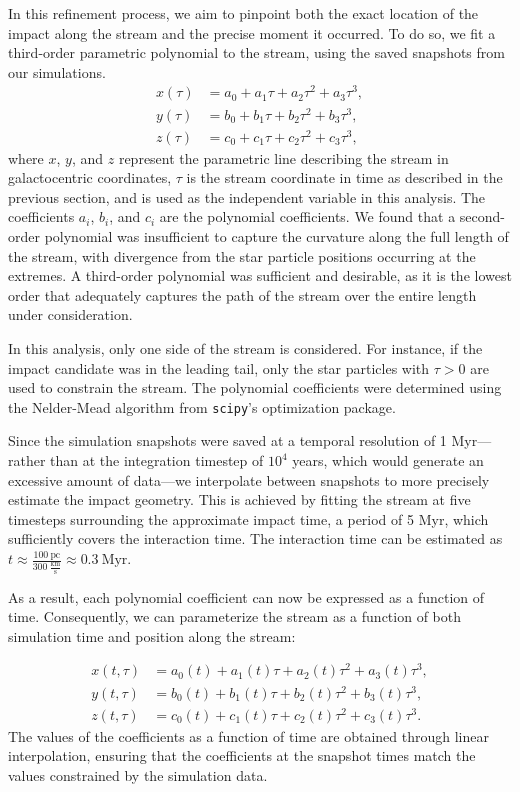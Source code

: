 \documentclass[]{aa}
\begin{document}
    In this refinement process, we aim to pinpoint both the exact location of the impact along the stream and the precise moment it occurred. To do so, we fit a third-order parametric polynomial to the stream, using the saved snapshots from our simulations.
    \begin{align}
      x(\tau) &= a_0 + a_1 \tau + a_2 \tau^2 + a_3 \tau^3, \\ 
      y(\tau) &= b_0 + b_1 \tau + b_2 \tau^2 + b_3 \tau^3, \\
      z(\tau) &= c_0 + c_1 \tau + c_2 \tau^2 + c_3 \tau^3,
      \end{align}
    where $x$, $y$, and $z$ represent the parametric line describing the stream in galactocentric coordinates, $\tau$ is the stream coordinate in time as described in the previous section, and is used as the independent variable in this analysis. The coefficients $a_i$, $b_i$, and $c_i$ are the polynomial coefficients. We found that a second-order polynomial was insufficient to capture the curvature along the full length of the stream, with divergence from the star particle positions occurring at the extremes. A third-order polynomial was sufficient and desirable, as it is the lowest order that adequately captures the path of the stream over the entire length under consideration.

    In this analysis, only one side of the stream is considered. For instance, if the impact candidate was in the leading tail, only the star particles with $\tau > 0$ are used to constrain the stream. The polynomial coefficients were determined using the Nelder-Mead algorithm from \texttt{scipy}'s optimization package.

    Since the simulation snapshots were saved at a temporal resolution of 1 Myr—rather than at the integration timestep of $10^4$ years, which would generate an excessive amount of data—we interpolate between snapshots to more precisely estimate the impact geometry. This is achieved by fitting the stream at five timesteps surrounding the approximate impact time, a period of 5 Myr, which sufficiently covers the interaction time. The interaction time can be estimated as $t \approx \frac{100~\text{pc}}{300~\frac{\text{km}}{\text{s}}} \approx 0.3~\text{Myr}$.

    As a result, each polynomial coefficient can now be expressed as a function of time. Consequently, we can parameterize the stream as a function of both simulation time and position along the stream:

    \begin{align}
      x(t,\tau) &= a_0(t) + a_1(t)\tau + a_2(t) \tau^2 + a_3(t)\tau^3, \\ 
      y(t,\tau) &= b_0(t) + b_1(t)\tau + b_2(t) \tau^2 + b_3(t)\tau^3, \\
      z(t,\tau) &= c_0(t) + c_1(t)\tau + c_2(t) \tau^2 + c_3(t)\tau^3.
      \end{align}
    The values of the coefficients as a function of time are obtained through linear interpolation, ensuring that the coefficients at the snapshot times match the values constrained by the simulation data.
\end{document}
